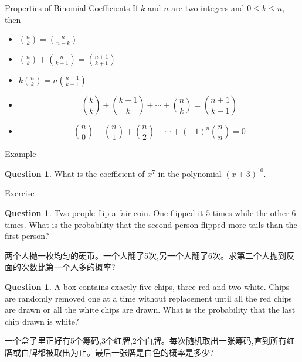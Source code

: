 \documentclass{beamer}
\theoremstyle{definition}
\newtheorem{ques}[defn]{Question}
\begin{document}
\begin{frame}{Properties of Binomial Coefficients}
    If $k$ and $n$ are two integers and $0 \leq k \leq n$, then
    \begin{itemize}
        \item $\binom{n}{k}=\binom{n}{n-k}$
        \item $\binom{n}{k}+\binom{n}{k+1}=\binom{n+1}{k+1}$
        \item $k\binom{n}{k}=n\binom{n-1}{k-1}$
        \item
              \begin{equation*}
                  \binom{k}{k}+\binom{k+1}{k}+\cdots+\binom{n}{k}=\binom{n+1}{k+1}
              \end{equation*}
        \item  \begin{equation*}
                  \binom{n}{0}-\binom{n}{1}+\binom{n}{2}+\cdots+(-1)^n\binom{n}{n}=0
              \end{equation*}
    \end{itemize}
\end{frame}
\begin{frame}{Example}
    \begin{ques}
        What is the coefficient of $x^7$ in the polynomial $(x+3)^{10}$.
    \end{ques}
\end{frame}
\begin{frame}{Exercise}
    \begin{ques}
        Two people flip a fair coin. One flipped it $5$ times while the other $6$ times. What is the probability that the second person
        flipped more tails than the first person?

        两个人抛一枚均匀的硬币。一个人翻了5次,另一个人翻了6次。求第二个人抛到反面的次数比第一个人多的概率?
    \end{ques}
    \begin{ques}
        A box contains exactly five chips, three red and two white. Chips are randomly removed one at a time without
        replacement until all the red chips are drawn or all the white chips are drawn. What is the probability that the last chip drawn is white?
    
        一个盒子里正好有5个筹码,3个红牌,2个白牌。每次随机取出一张筹码,直到所有红牌或白牌都被取出为止。最后一张牌是白色的概率是多少?
    \end{ques}
\end{frame}
\end{document}
